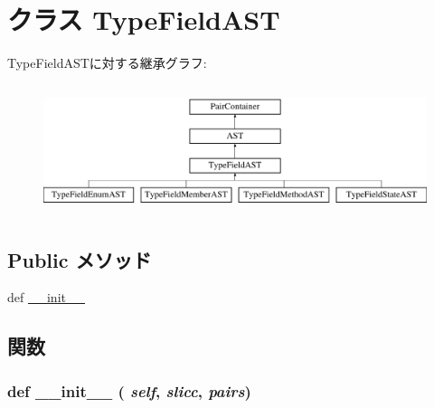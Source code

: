 \hypertarget{classslicc_1_1ast_1_1TypeFieldAST_1_1TypeFieldAST}{
\section{クラス TypeFieldAST}
\label{classslicc_1_1ast_1_1TypeFieldAST_1_1TypeFieldAST}
}
TypeFieldASTに対する継承グラフ:\begin{figure}[H]
\begin{center}
\leavevmode
\includegraphics[height=3.83562cm]{classslicc_1_1ast_1_1TypeFieldAST_1_1TypeFieldAST}
\end{center}
\end{figure}
\subsection*{Public メソッド}
\begin{DoxyCompactItemize}
\item 
def \hyperlink{classslicc_1_1ast_1_1TypeFieldAST_1_1TypeFieldAST_ac775ee34451fdfa742b318538164070e}{\_\-\_\-init\_\-\_\-}
\end{DoxyCompactItemize}


\subsection{関数}
\hypertarget{classslicc_1_1ast_1_1TypeFieldAST_1_1TypeFieldAST_ac775ee34451fdfa742b318538164070e}{
\subsubsection[{\_\-\_\-init\_\-\_\-}]{\setlength{\rightskip}{0pt plus 5cm}def \_\-\_\-init\_\-\_\- ( {\em self}, \/   {\em slicc}, \/   {\em pairs})}}
\label{classslicc_1_1ast_1_1TypeFieldAST_1_1TypeFieldAST_ac775ee34451fdfa742b318538164070e}


